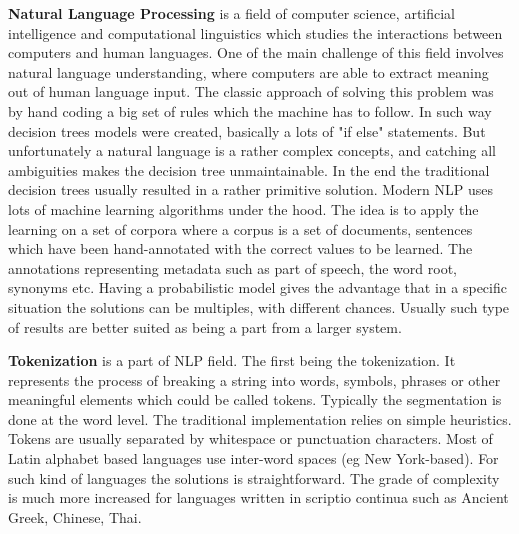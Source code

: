 \textbf{Natural Language Processing} is a field of computer science, artificial intelligence and computational linguistics which studies the interactions between computers and human languages. One of the main challenge of this field involves natural language understanding, where computers are able to extract meaning out of human language input. The classic approach of solving this problem was by hand coding a big set of rules which the machine has to follow. In such way decision trees models were created, basically a lots of "if else" statements. But unfortunately a natural language is a rather complex concepts, and catching all ambiguities makes the decision tree unmaintainable. In the end the traditional decision trees usually resulted in a rather primitive solution. Modern NLP uses lots of machine learning algorithms under the hood. The idea is to apply the learning on a set of corpora where a corpus is a set of documents, sentences which have been hand-annotated with the correct values to be learned. The annotations representing metadata such as part of speech, the word root, synonyms etc. Having a probabilistic model gives the advantage that in a specific situation the solutions can be multiples, with different chances. Usually such type of results are better suited as being a part from a larger system.

\textbf{Tokenization} is a part of NLP field. The first being the tokenization. It represents the process of breaking a string into words, symbols, phrases or other meaningful elements which could be called tokens. Typically the segmentation is done at the word level. The traditional implementation relies on simple heuristics. Tokens are usually separated by whitespace or punctuation characters. Most of Latin alphabet based languages use inter-word spaces (eg New York-based). For such kind of languages the solutions is straightforward. The grade of complexity is much more increased for languages written in scriptio continua such as Ancient Greek, Chinese, Thai.

